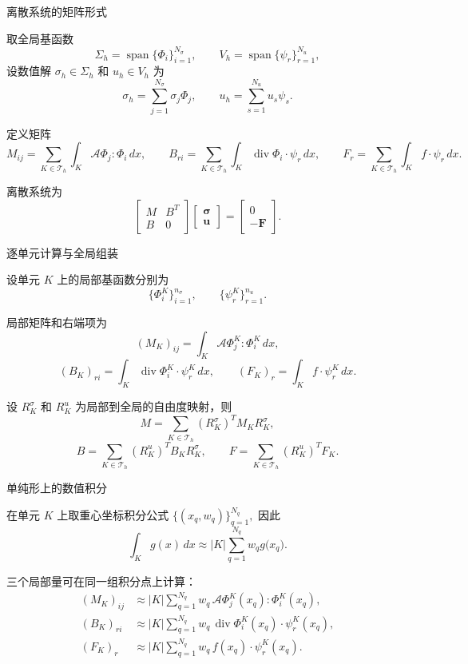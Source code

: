 \documentclass[aspectratio=169,professionalfonts]{ctexbeamer}
\begin{document}
\begin{frame}{离散系统的矩阵形式}

取全局基函数
$$
\Sigma_h=\operatorname{span}\{\Phi_i\}_{i=1}^{N_\sigma},
\qquad
V_h=\operatorname{span}\{\psi_r\}_{r=1}^{N_u},
$$
设数值解 $\sigma_h \in\Sigma_h$ 和 $u_h\in V_h$ 为
$$
\sigma_h=\sum_{j=1}^{N_\sigma}\sigma_j\Phi_j,
\qquad
u_h=\sum_{s=1}^{N_u}u_s\psi_s.
$$

定义矩阵
$$
M_{ij}
=
\sum_{K\in\mathcal T_h}
\int_K
\mathcal A\Phi_j:\Phi_i\,dx,
\qquad
B_{ri}
=
\sum_{K\in\mathcal T_h}
\int_K
\operatorname{div}\Phi_i\cdot\psi_r\,dx,
\qquad
F_r
=
\sum_{K\in\mathcal T_h}
\int_K f\cdot\psi_r\,dx.
$$

离散系统为
$$
\begin{bmatrix}
M&B^T\\
B&0
\end{bmatrix}
\begin{bmatrix}
\boldsymbol{\sigma}\\
\boldsymbol{u}
\end{bmatrix}
=
\begin{bmatrix}
0\\
-\boldsymbol{F}
\end{bmatrix}.
$$

\end{frame}


\begin{frame}{逐单元计算与全局组装}

设单元 $K$ 上的局部基函数分别为
$$
\{\Phi_i^K\}_{i=1}^{n_\sigma},
\qquad
\{\psi_r^K\}_{r=1}^{n_u}.
$$

局部矩阵和右端项为
$$
(M_K)_{ij}
=
\int_K
\mathcal A\Phi_j^K:\Phi_i^K\,dx,
$$
$$
(B_K)_{ri}
=
\int_K
\operatorname{div}\Phi_i^K\cdot\psi_r^K\,dx,
\qquad
(F_K)_r
=
\int_K f\cdot\psi_r^K\,dx.
$$

设 $R_K^\sigma$ 和 $R_K^u$ 为局部到全局的自由度映射，则
$$
M
=
\sum_{K\in\mathcal T_h}
(R_K^\sigma)^T M_KR_K^\sigma,
$$
$$
B
=
\sum_{K\in\mathcal T_h}
(R_K^u)^TB_KR_K^\sigma,
\qquad
F
=
\sum_{K\in\mathcal T_h}
(R_K^u)^TF_K.
$$

\end{frame}


\begin{frame}{单纯形上的数值积分}
\begingroup
\small
\setlength{\abovedisplayskip}{4pt}
\setlength{\belowdisplayskip}{4pt}

在单元 $K$ 上取重心坐标积分公式
$\{( x_q, w_q)\}_{q=1}^{N_q},$ 
因此
\[
\int_K g(x)\,dx
\approx
|K|
\sum_{q=1}^{N_q}
 w_q
g\bigl(x_q\bigr).
\]

三个局部量可在同一组积分点上计算：
\[
\begin{aligned}
(M_K)_{ij}
&\approx
|K|\sum_{q=1}^{N_q} w_q\,
\mathcal A\Phi_j^K(x_q):\Phi_i^K(x_q),\\
(B_K)_{ri}
&\approx
|K|\sum_{q=1}^{N_q} w_q\,
\operatorname{div}\Phi_i^K(x_q)\cdot\psi_r^K(x_q),\\
(F_K)_r
&\approx
|K|\sum_{q=1}^{N_q} w_q\,
f(x_q)\cdot\psi_r^K(x_q).
\end{aligned}
\]

\endgroup
\end{frame}
\end{document}
